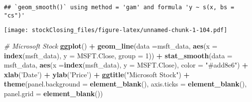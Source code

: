 \documentclass[]{article}
\newenvironment{Shaded}{\begin{snugshade}}{\end{snugshade}}
\newcommand{\CommentTok}[1]{\textcolor[rgb]{0.56,0.35,0.01}{\textit{#1}}}
\newcommand{\DataTypeTok}[1]{\textcolor[rgb]{0.13,0.29,0.53}{#1}}
\newcommand{\DecValTok}[1]{\textcolor[rgb]{0.00,0.00,0.81}{#1}}
\newcommand{\KeywordTok}[1]{\textcolor[rgb]{0.13,0.29,0.53}{\textbf{#1}}}
\newcommand{\NormalTok}[1]{#1}
\newcommand{\OperatorTok}[1]{\textcolor[rgb]{0.81,0.36,0.00}{\textbf{#1}}}
\newcommand{\StringTok}[1]{\textcolor[rgb]{0.31,0.60,0.02}{#1}}
\begin{document}
\begin{Shaded}
\end{Shaded}

\begin{verbatim}
## `geom_smooth()` using method = 'gam' and formula 'y ~ s(x, bs = "cs")'
\end{verbatim}

\texttt{[image: stockClosing\_files/figure-latex/unnamed-chunk-1-104.pdf]}

\begin{Shaded}
\begin{Highlighting}[]
\CommentTok{# Microsoft Stock}
\KeywordTok{ggplot}\NormalTok{() }\OperatorTok{+}
\StringTok{  }\KeywordTok{geom_line}\NormalTok{(}\DataTypeTok{data =}\NormalTok{msft_data, }\KeywordTok{aes}\NormalTok{(}\DataTypeTok{x =} \KeywordTok{index}\NormalTok{(msft_data), }\DataTypeTok{y =}\NormalTok{ MSFT.Close, }\DataTypeTok{group =} \DecValTok{1}\NormalTok{)) }\OperatorTok{+}
\StringTok{  }\KeywordTok{stat_smooth}\NormalTok{(}\DataTypeTok{data =}\NormalTok{ msft_data, }\KeywordTok{aes}\NormalTok{(}\DataTypeTok{x =}\KeywordTok{index}\NormalTok{(msft_data), }\DataTypeTok{y =}\NormalTok{ MSFT.Close), }\DataTypeTok{color =} \StringTok{"#add8e6"}\NormalTok{) }\OperatorTok{+}
\StringTok{  }\KeywordTok{xlab}\NormalTok{(}\StringTok{'Date'}\NormalTok{) }\OperatorTok{+}
\StringTok{  }\KeywordTok{ylab}\NormalTok{(}\StringTok{'Price'}\NormalTok{) }\OperatorTok{+}
\StringTok{  }\KeywordTok{ggtitle}\NormalTok{(}\StringTok{"Microsoft Stock"}\NormalTok{) }\OperatorTok{+}
\StringTok{  }\KeywordTok{theme}\NormalTok{(}\DataTypeTok{panel.background =} \KeywordTok{element_blank}\NormalTok{(),}
        \DataTypeTok{axis.ticks =} \KeywordTok{element_blank}\NormalTok{(),}
        \DataTypeTok{panel.grid =} \KeywordTok{element_blank}\NormalTok{())}
\end{Highlighting}
\end{Shaded}
\end{document}
